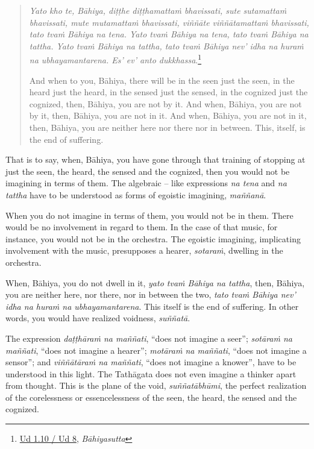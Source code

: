 \begin{quote}
\emph{Yato kho te, Bāhiya, diṭṭhe diṭṭhamattaṁ bhavissati, sute sutamattaṁ bhavissati, mute mutamattaṁ bhavissati, viññāte viññātamattaṁ bhavissati, tato tvaṁ Bāhiya na tena. Yato tvaṁ Bāhiya na tena, tato tvaṁ Bāhiya na tattha. Yato tvaṁ Bāhiya na tattha, tato tvaṁ Bāhiya nev' idha na huraṁ na ubhayamantarena. Es' ev' anto dukkhassa}.\footnote{\href{https://suttacentral.net/ud1.10/pli/ms}{Ud 1.10 / Ud 8}, \emph{Bāhiyasutta}}

And when to you, Bāhiya, there will be in the seen just the seen, in the heard just the heard, in the sensed just the sensed, in the cognized just the cognized, then, Bāhiya, you are not by it. And when, Bāhiya, you are not by it, then, Bāhiya, you are not in it. And when, Bāhiya, you are not in it, then, Bāhiya, you are neither here nor there nor in between. This, itself, is the end of suffering.
\end{quote}

That is to say, when, Bāhiya, you have gone through that training of stopping at just the seen, the heard, the sensed and the cognized, then you would not be imagining in terms of them. The algebraic -- like expressions \emph{na tena} and \emph{na tattha} have to be understood as forms of egoistic imagining, \emph{maññanā}.

When you do not imagine in terms of them, you would not be in them. There would be no involvement in regard to them. In the case of that music, for instance, you would not be in the orchestra. The egoistic imagining, implicating involvement with the music, presupposes a hearer, \emph{sotaraṁ}, dwelling in the orchestra.

When, Bāhiya, you do not dwell in it, \emph{yato tvaṁ Bāhiya na tattha}, then, Bāhiya, you are neither here, nor there, nor in between the two, \emph{tato tvaṁ Bāhiya nev' idha na huraṁ na ubhayamantarena}. This itself is the end of suffering. In other words, you would have realized voidness, \emph{suññatā}.

The expression \emph{daṭṭhāraṁ na maññati}, ``does not imagine a seer''; \emph{sotāraṁ na maññati}, ``does not imagine a hearer''; \emph{motāraṁ na maññati}, ``does not imagine a sensor''; and \emph{viññātāraṁ na maññati}, ``does not imagine a knower'', have to be understood in this light. The Tathāgata does not even imagine a thinker apart from thought. This is the plane of the void, \emph{suññatābhūmi}, the perfect realization of the corelessness or essencelessness of the seen, the heard, the sensed and the cognized.


